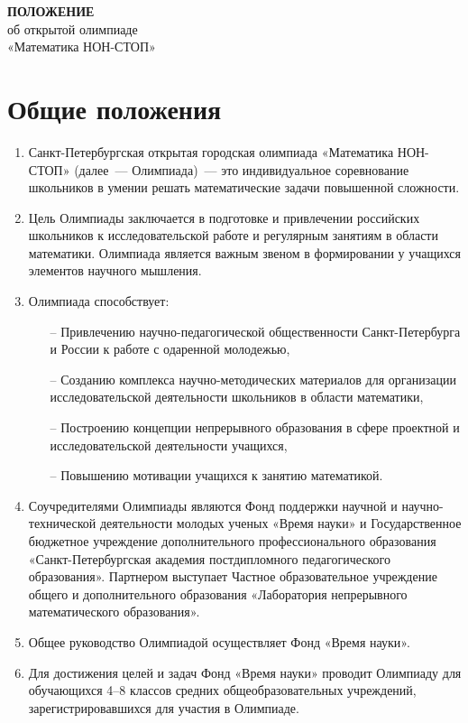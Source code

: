\documentclass[a4paper,12pt]{article}
\newcommand{\mns}{«Математика НОН-СТОП»\xspace}
\begin{document}


\begin{center} \Large
	{\bf ПОЛОЖЕНИЕ} \\
	об открытой олимпиаде \\
	\mns \\
\end{center}

\section{Общие положения}

\begin{enumerate}
	\item Санкт-Петербургская открытая городская олимпиада «Математика НОН-СТОП» (далее~— Олимпиада)~— это индивидуальное соревнование школьников в умении решать математические задачи повышенной сложности.
	\item Цель Олимпиады заключается в подготовке и привлечении российских школьников к исследовательской работе и регулярным занятиям в области математики. Олимпиада является важным звеном в формировании у учащихся элементов научного мышления.
	\item Олимпиада способствует: \begin{enumerate}
	   \item[–] Привлечению научно-педагогической общественности Санкт-Петербурга и России к работе с одаренной молодежью,
	   \item[–] Созданию комплекса научно-методических материалов для организации исследовательской деятельности школьников в области математики,
	   \item[–] Построению концепции непрерывного образования в сфере проектной и
исследовательской деятельности учащихся,
	   \item[–] Повышению мотивации учащихся к занятию математикой.
   \end{enumerate}
	\item Соучредителями Олимпиады являются Фонд поддержки научной и научно-технической деятельности молодых ученых «Время науки» и Государственное бюджетное учреждение дополнительного профессионального образования «Санкт-Петербургская академия постдипломного педагогического образования». Партнером выступает Частное образовательное учреждение общего и дополнительного образования «Лаборатория непрерывного математического образования».
	\item Общее руководство Олимпиадой осуществляет Фонд «Время науки». 
	\item Для достижения целей и задач Фонд «Время науки» проводит Олимпиаду для обучающихся 4–8 классов средних общеобразовательных учреждений, зарегистрировавшихся для участия в Олимпиаде.

\end{enumerate}
\end{document}
